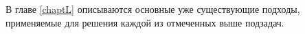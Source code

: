 % 

В главе \ref{chaptL} описываются основные уже существующие подходы, применяемые
для решения каждой из отмеченных выше подзадач.

\clearpage